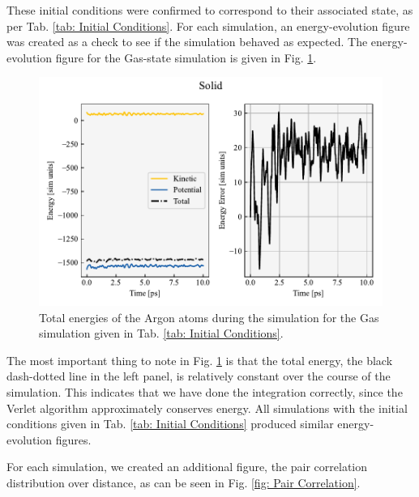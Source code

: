 \documentclass{IAYCPro}
\begin{document}
\raggedbottom
\newpage

These initial conditions were confirmed to correspond to their associated state, as per Tab. \ref{tab: Initial Conditions}. For each simulation, an energy-evolution figure was created as a check to see if the simulation behaved as expected. The energy-evolution figure for the Gas-state simulation is given in Fig. \ref{fig: Energy Evolution}.

\begin{figure}[H]
    \centering
    \includegraphics[width=1\textwidth]{figs/energy_err.pdf}
    \caption{Total energies of the Argon atoms during the simulation for the Gas simulation given in Tab. \ref{tab: Initial Conditions}. }
    \label{fig: Energy Evolution} 
\end{figure}

The most important thing to note in Fig. \ref{fig: Energy Evolution} is that the total energy, the black dash-dotted line in the left panel, is relatively constant over the course of the simulation. This indicates that we have done the integration correctly, since the Verlet algorithm 
approximately conserves energy. All simulations with the initial conditions given in Tab. \ref{tab: Initial Conditions} produced similar energy-evolution figures.

For each simulation, we created an additional figure, the pair correlation distribution over distance, as can be seen in Fig. \ref{fig: Pair Correlation}.

\raggedbottom
\newpage
\end{document}
